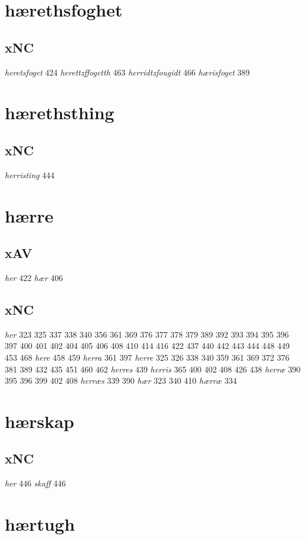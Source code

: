 \documentclass[a4paper,twocolumn]{article}
\begin{document}
\section{hærethsfoghet}
\label{sec:orgd3f1114}
\subsection{xNC}
\label{sec:org3950abc}
\emph{heretsfoget} 424 \emph{herettzffogetth} 463 \emph{herridtzfougidt} 466 \emph{hærisfoget} 389 
\section{hærethsthing}
\label{sec:org4b7ae77}
\subsection{xNC}
\label{sec:orgb9a5d64}
\emph{herristing} 444 
\section{hærre}
\label{sec:orgdf55cda}
\subsection{xAV}
\label{sec:org98344de}
\emph{her} 422 \emph{hær} 406 
\subsection{xNC}
\label{sec:org334cb5d}
\emph{her} 323 325 337 338 340 356 361 369 376 377 378 379 389 392 393 394 395 396 397 400 401 402 404 405 406 408 410 414 416 422 437 440 442 443 444 448 449 453 468 \emph{here} 458 459 \emph{herra} 361 397 \emph{herre} 325 326 338 340 359 361 369 372 376 381 389 432 435 451 460 462 \emph{herres} 439 \emph{herris} 365 400 402 408 426 438 \emph{herræ} 390 395 396 399 402 408 \emph{herræs} 339 390 \emph{hær} 323 340 410 \emph{hærræ} 334 
\section{hærskap}
\label{sec:org41405bb}
\subsection{xNC}
\label{sec:org3c660af}
\emph{her} 446 \emph{skaff} 446 
\section{hærtugh}
\label{sec:orgfbee64b}
\end{document}
